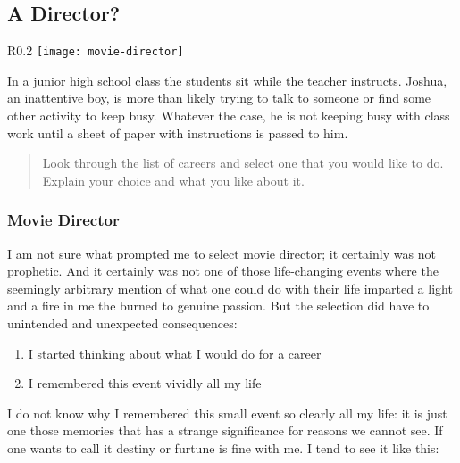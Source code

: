\subsection{A Director?}\begin{wrapfigure}{R}{0.2\textwidth}
         \vspace{-1cm}
        \texttt{[image: movie-director]}
         \vspace{-1cm}
    \end{wrapfigure} 
  In a junior high school class the students sit while the teacher instructs. Joshua, an inattentive boy, is more than likely trying to talk to someone or find some other activity to keep busy. Whatever the case, he is not keeping busy with class work until a sheet of paper with instructions is passed to him. 
\begin{quote}
   Look through the list of careers and select one that you would like to do. Explain your choice and what you like about it.
\end{quote}
\subsubsection{Movie Director}
I am not sure what prompted me to select movie director; it certainly was not prophetic. And it certainly was not one of those life-changing events where the seemingly arbitrary mention of what one could do with their life imparted a light and a fire in me the burned to genuine passion. But the selection did have to unintended and unexpected consequences:
\begin{enumerate}
    \item I started thinking about what I would do for a career
\item I remembered this event vividly all my life
\end{enumerate}
I do not know why I remembered this small event so clearly all my life: it is just one those memories that has a strange significance for reasons we cannot see. If one wants to call it destiny or furtune is fine with me. I tend to see it like this:

